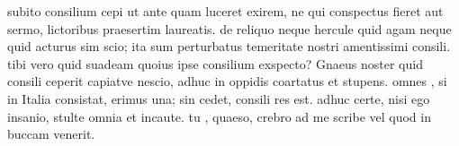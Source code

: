 


 subito consilium cepi ut ante quam luceret exirem, ne qui conspectus fieret aut sermo, lictoribus praesertim laureatis. de reliquo neque hercule quid agam neque quid acturus sim scio; ita sum perturbatus temeritate nostri amentissimi consili. tibi vero quid suadeam quoius ipse consilium exspecto? Gnaeus noster quid consili ceperit capiatve nescio, adhuc in oppidis coartatus et stupens. omnes , si in Italia consistat, erimus una; sin cedet, consili res est. adhuc certe, nisi ego insanio, stulte omnia et incaute. tu , quaeso, crebro ad me scribe vel quod in buccam venerit.
